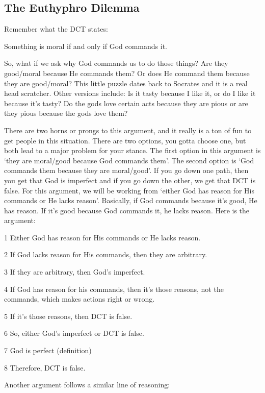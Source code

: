 \subsection{The Euthyphro Dilemma}

Remember what the DCT states:

\begin{center}
\noindent Something is moral if and only if God commands it.
\end{center}

So, what if we ask why God commands us to do those things? Are they good/moral because He commands them? Or does He command them because they are good/moral? This little puzzle dates back to Socrates and it is a real head scratcher. Other versions include: Is it tasty because I like it, or do I like it because it’s tasty? Do the gods love certain acts because they are pious or are they pious because the gods love them?

There are two horns or prongs to this argument, and it really is a ton of fun to get people in this situation. There are two options, you gotta choose one, but both lead to a major problem for your stance. The first option in this argument is ‘they are moral/good because God commands them’. The second option is ‘God commands them because they are moral/good’. If you go down one path, then you get that God is imperfect and if you go down the other, we get that DCT is false. For this argument, we will be working from ‘either God has reason for His commands or He lacks reason’. Basically, if God commands because it’s good, He has reason. If it’s good because God commands it, he lacks reason.  Here is the argument:
\begin{earg}
    \item[1] Either God has reason for His commands or He lacks reason.
    \item[2] If God lacks reason for His commands, then they are arbitrary.
    \item[3] If they are arbitrary, then God’s imperfect.
    \item[4] If God has reason for his commands, then it’s those reasons, not the commands, which makes actions right or wrong.
    \item[5] If it’s those reasons, then DCT is false.
    \item[6] So, either God’s imperfect or DCT is false.
    \item[7] God is perfect (definition)
    \item[8] Therefore, DCT is false. 
\end{earg}
Another argument follows a similar line of reasoning:

